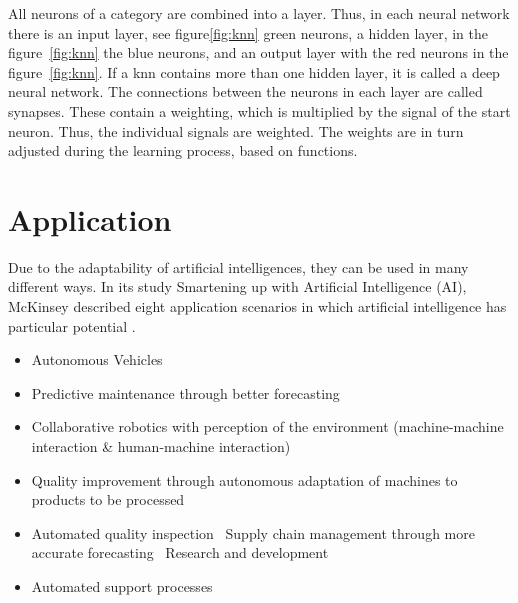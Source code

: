\bigskip

All neurons of a category are combined into a layer. Thus, in each neural network there is an input layer, see figure\ref{fig:knn} green neurons, a hidden layer, in the figure~\ref{fig:knn} the blue neurons, and an output layer with the red neurons in the figure~\ref{fig:knn}. If a \ac{knn} contains more than one hidden layer, it is called a deep neural network. The connections between the neurons in each layer are called synapses. These contain a weighting, which is multiplied by the signal of the start neuron. Thus, the individual signals are weighted. The weights are in turn adjusted during the learning process, based on functions.


\section{Application}

Due to the adaptability of artificial intelligences, they can be used in many different ways. In its study \glqq Smartening up with Artificial Intelligence (AI)\grqq{}, McKinsey described eight application scenarios in which artificial intelligence has particular potential \cite{McKinsey:2017}.

\begin{itemize}
    \item Autonomous Vehicles
    \item Predictive maintenance through better forecasting 
    \item Collaborative robotics with perception of the environment (machine-machine interaction \& human-machine interaction)
    \item Quality improvement through autonomous adaptation of machines to products to be processed
    \item Automated quality inspection
    \ Supply chain management through more accurate forecasting
    \ Research and development
    \item Automated support processes
\end{itemize}




